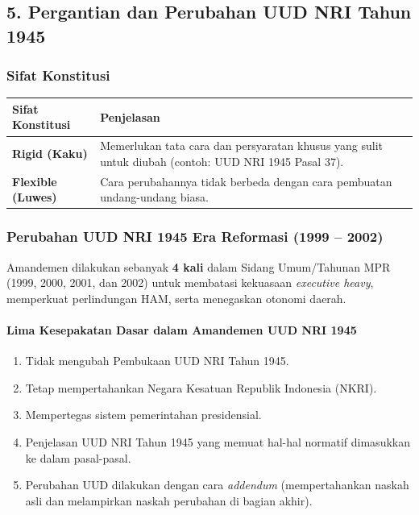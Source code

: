 \subsection{5. Pergantian dan Perubahan UUD NRI Tahun 1945}

\subsubsection{Sifat Konstitusi}
\begin{table}[h!]
\centering
\begin{tabular}{|l|p{10cm}|}
\hline
\textbf{Sifat Konstitusi} & \textbf{Penjelasan} \\ \hline
\textbf{Rigid (Kaku)} & Memerlukan tata cara dan persyaratan khusus yang sulit untuk diubah (contoh: UUD NRI 1945 Pasal 37). \\ \hline
\textbf{Flexible (Luwes)} & Cara perubahannya tidak berbeda dengan cara pembuatan undang-undang biasa. \\ \hline
\end{tabular}
\end{table}

\subsubsection{Perubahan UUD NRI 1945 Era Reformasi (1999 -- 2002)}
Amandemen dilakukan sebanyak \textbf{4 kali} dalam Sidang Umum/Tahunan MPR (1999, 2000, 2001, dan 2002) untuk membatasi kekuasaan \textit{executive heavy}, memperkuat perlindungan HAM, serta menegaskan otonomi daerah.

\paragraph{Lima Kesepakatan Dasar dalam Amandemen UUD NRI 1945}
\begin{enumerate}
    \item Tidak mengubah Pembukaan UUD NRI Tahun 1945.
    \item Tetap mempertahankan Negara Kesatuan Republik Indonesia (NKRI).
    \item Mempertegas sistem pemerintahan presidensial.
    \item Penjelasan UUD NRI Tahun 1945 yang memuat hal-hal normatif dimasukkan ke dalam pasal-pasal.
    \item Perubahan UUD dilakukan dengan cara \textit{addendum} (mempertahankan naskah asli dan melampirkan naskah perubahan di bagian akhir).
\end{enumerate}

